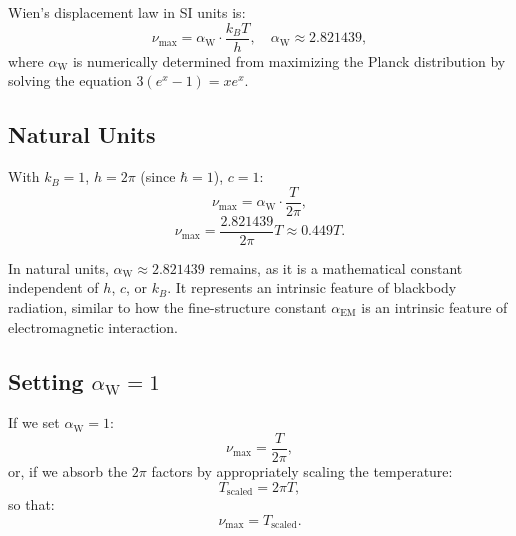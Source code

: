 \documentclass[12pt,a4paper]{article}
\newcommand{\alphaEM}{\alpha_{\text{EM}}}
\newcommand{\alphaW}{\alpha_{\text{W}}}
\begin{document}
	Wien's displacement law in SI units is:
	\[
	\nu_{\text{max}} = \alphaW \cdot \frac{k_B T}{h}, \quad \alphaW \approx 2.821439,
	\]
	where \(\alphaW\) is numerically determined from maximizing the Planck distribution by solving the equation \(3 (e^x - 1) = x e^x\).
	
	\subsection{Natural Units}
	
	With \(k_B = 1\), \(h = 2\pi\) (since \(\hbar = 1\)), \(c = 1\):
	\[
	\nu_{\text{max}} = \alphaW \cdot \frac{T}{2\pi},
	\]
	\[
	\nu_{\text{max}} = \frac{2.821439}{2\pi} T \approx 0.449 T.
	\]
	
	In natural units, \(\alphaW \approx 2.821439\) remains, as it is a mathematical constant independent of \(h\), \(c\), or \(k_B\). It represents an intrinsic feature of blackbody radiation, similar to how the fine-structure constant \(\alphaEM\) is an intrinsic feature of electromagnetic interaction.
	
	\subsection{Setting \(\alphaW = 1\)}
	
	If we set \(\alphaW = 1\):
	\[
	\nu_{\text{max}} = \frac{T}{2\pi},
	\]
	or, if we absorb the \(2\pi\) factors by appropriately scaling the temperature:
	\[
	T_{\text{scaled}} = 2\pi T,
	\]
	so that:
	\[
	\nu_{\text{max}} = T_{\text{scaled}}.
	\]
	
\end{document}
